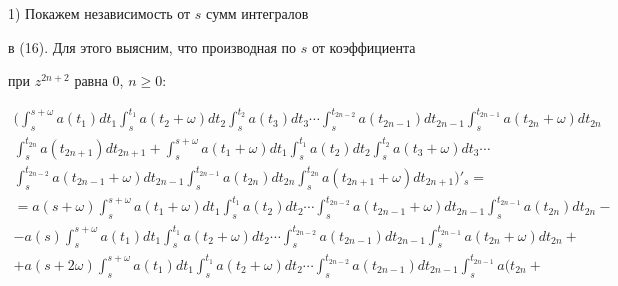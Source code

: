 \begin{pf} 1) Покажем независимость от $s$ сумм интегралов


в (16). Для этого выясним, что производная по $s$ от коэффициента


при $z^{2n+2}$ равна 0, $n\ge0$:


\begin{gather*}


\biggl(\int_s^{s+\omega}a(t_1)dt_1


\int_s^{t_1}a(t_2+\omega)dt_2\int_s^{t_2}a(t_3)dt_3\dotsb


\int_s^{t_{2n-2}}a(t_{2n-1})dt_{2n-1}


\int_s^{t_{2n-1}}a(t_{2n}+\omega)dt_{2n}\\


%


\int_s^{t_{2n}}a(t_{2n+1})dt_{2n+1}+


\int_s^{s+\omega}a(t_1+\omega)dt_1


\int_s^{t_1}a(t_2)dt_2\int_s^{t_2}a(t_3+\omega)dt_3\dotsb\\


%


\int_s^{t_{2n-2}}a(t_{2n-1}+\omega)dt_{2n-1}\int_s^{t_{2n-1}}a(t_{2n})dt_{2n}


\int_s^{t_{2n}}a(t_{2n+1}+\omega)dt_{2n+1}\biggr)'_s=\\


%


=a(s+\omega)\int_s^{s+\omega}a(t_1+\omega)dt_1


\int_s^{t_1}a(t_2)dt_2\dotsb


\int_s^{t_{2n-2}}a(t_{2n-1}+


\omega)dt_{2n-1}\int_s^{t_{2n-1}}a(t_{2n})dt_{2n}-\\


%


-a(s)


\int_s^{s+\omega}a(t_1)dt_1


\int_s^{t_1}a(t_2+\omega)dt_2\dotsb


\int_s^{t_{2n-2}}a(t_{2n-1})dt_{2n-1}\int_s^{t_{2n-1}}a(t_{2n}+


\omega)dt_{2n}+\\


%


+a(s+2\omega)\int_s^{s+\omega}a(t_1)dt_1


\int_s^{t_1}a(t_2+\omega)dt_2\dotsb


\int_s^{t_{2n-2}}a(t_{2n-1})dt_{2n-1}\int_s^{t_{2n-1}}a(t_{2n}+



\end{gather*}
\end{pf}
